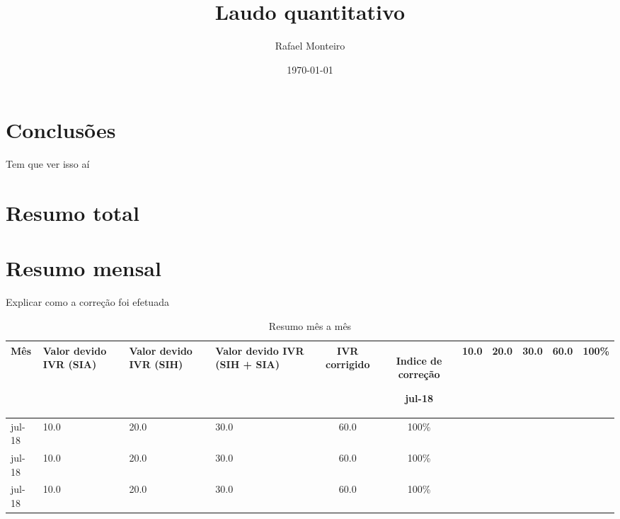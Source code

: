 \documentclass{report}
\title{Laudo quantitativo}
\author{Rafael Monteiro}
\date{\today}
\begin{document}
\maketitle

\section{Conclusões}
Tem que ver isso aí

\section{Resumo total}
\begin{tabular}
	\caption{Resumo do período completo}
\end{tabular}

\section{Resumo mensal}
Explicar como a correção foi efetuada

\begin{longtable}[c]{|p{1cm}|p{2.3cm}|p{2.3cm}|p{2.3cm}|c|c|}
	\caption{Resumo mês a mês} \\ \hline
	\textbf{Mês} &
	\textbf{Valor devido IVR (SIA)} &
	\textbf{Valor devido IVR (SIH)} &
	\textbf{Valor devido IVR (SIH + SIA)} &
	\textbf{IVR corrigido} &
	\textbf{Indice de correção} 
	\endhead \hline

	jul-18 & 10.0 & 20.0 & 30.0 & 60.0 & 100\% \\ \hline
	jul-18 & 10.0 & 20.0 & 30.0 & 60.0 & 100\% \\ \hline
	jul-18 & 10.0 & 20.0 & 30.0 & 60.0 & 100\% \\ \hline
	jul-18 & 10.0 & 20.0 & 30.0 & 60.0 & 100\% \\ \hline
\end{longtable}

	
\end{document}
